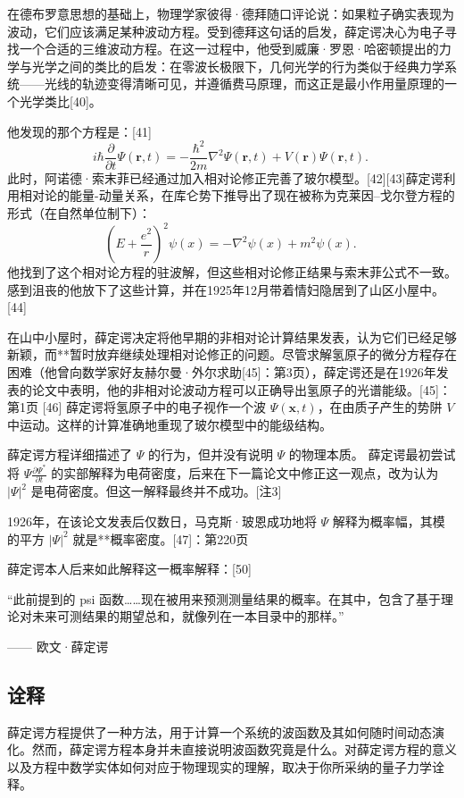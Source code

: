在德布罗意思想的基础上，物理学家彼得·德拜随口评论说：如果粒子确实表现为波动，它们应该满足某种波动方程。受到德拜这句话的启发，薛定谔决心为电子寻找一个合适的三维波动方程。在这一过程中，他受到威廉·罗恩·哈密顿提出的力学与光学之间的类比的启发：在零波长极限下，几何光学的行为类似于经典力学系统——光线的轨迹变得清晰可见，并遵循费马原理，而这正是最小作用量原理的一个光学类比[40]。

他发现的那个方程是：[41]
$$
i\hbar \frac{\partial}{\partial t} \Psi(\mathbf{r}, t) = -\frac{\hbar^2}{2m} \nabla^2 \Psi(\mathbf{r}, t) + V(\mathbf{r}) \Psi(\mathbf{r}, t).~
$$
此时，阿诺德·索末菲已经通过加入相对论修正完善了玻尔模型。[42][43]薛定谔利用相对论的能量-动量关系，在库仑势下推导出了现在被称为克莱因–戈尔登方程的形式（在自然单位制下）：
$$
\left(E + \frac{e^2}{r}\right)^2 \psi(x) = -\nabla^2 \psi(x) + m^2 \psi(x).~
$$
他找到了这个相对论方程的驻波解，但这些相对论修正结果与索末菲公式不一致。感到沮丧的他放下了这些计算，并在1925年12月带着情妇隐居到了山区小屋中。[44]

在山中小屋时，薛定谔决定将他早期的非相对论计算结果发表，认为它们已经足够新颖，而**暂时放弃继续处理相对论修正的问题。尽管求解氢原子的微分方程存在困难（他曾向数学家好友赫尔曼·外尔求助[45]：第3页），薛定谔还是在1926年发表的论文中表明，他的非相对论波动方程可以正确导出氢原子的光谱能级。[45]：第1页 [46]
薛定谔将氢原子中的电子视作一个波 $\Psi(\mathbf{x}, t)$，在由质子产生的势阱 $V$ 中运动。这样的计算准确地重现了玻尔模型中的能级结构。

薛定谔方程详细描述了 $\Psi$ 的行为，但并没有说明 $\Psi$ 的物理本质。
薛定谔最初尝试将 $\Psi \frac{\partial \Psi^*}{\partial t}$ 的实部解释为电荷密度，后来在下一篇论文中修正这一观点，改为认为 $|\Psi|^2$ 是电荷密度。但这一解释最终并不成功。[注3]

1926年，在该论文发表后仅数日，马克斯·玻恩成功地将 $\Psi$ 解释为概率幅，其模的平方 $|\Psi|^2$ 就是**概率密度。[47]：第220页

薛定谔本人后来如此解释这一概率解释：[50]

“此前提到的 psi 函数……现在被用来预测测量结果的概率。在其中，包含了基于理论对未来可测结果的期望总和，就像列在一本目录中的那样。”

—— 欧文·薛定谔
\subsection{诠释}
薛定谔方程提供了一种方法，用于计算一个系统的波函数及其如何随时间动态演化。然而，薛定谔方程本身并未直接说明波函数究竟是什么。对薛定谔方程的意义以及方程中数学实体如何对应于物理现实的理解，取决于你所采纳的量子力学诠释。

